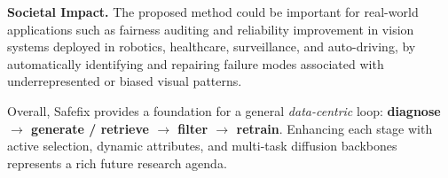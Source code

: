 \documentclass[10pt]{article} %
\newcommand{\model}{Safefix\xspace}
\begin{document}
\textbf{Societal Impact.} The proposed method could be important for real-world applications such as fairness auditing and reliability improvement in vision systems deployed in robotics, healthcare, surveillance, and auto-driving, by automatically identifying and repairing failure modes associated with underrepresented or biased visual patterns.

Overall, \model{} provides a foundation for a general \emph{data-centric}
loop: \textbf{diagnose $\rightarrow$ generate / retrieve $\rightarrow$
filter $\rightarrow$ retrain}.  Enhancing each stage with active
selection, dynamic attributes, and multi-task diffusion backbones
represents a rich future research agenda.
\end{document}
